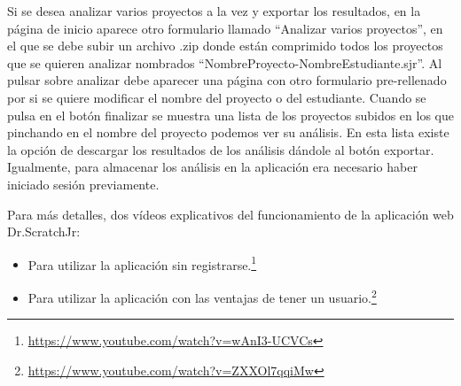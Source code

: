 \documentclass[a4paper, 12pt]{book}
\begin{document}
Si se desea analizar varios proyectos a la vez y exportar los resultados, en la página de inicio aparece otro formulario llamado ``Analizar varios proyectos'', en el que se debe subir un archivo .zip donde están comprimido todos los proyectos que se quieren analizar nombrados ``NombreProyecto-NombreEstudiante.sjr''.
Al pulsar sobre analizar debe aparecer una página con otro formulario pre-rellenado por si se quiere modificar el nombre del proyecto o del estudiante.
Cuando se pulsa en el botón finalizar se muestra una lista de los proyectos subidos en los que pinchando en el nombre del proyecto podemos ver su análisis.
En esta lista existe la opción de descargar los resultados de los análisis dándole al botón exportar.
Igualmente, para almacenar los análisis en la aplicación era necesario haber iniciado sesión previamente. 

Para más detalles, dos vídeos explicativos del funcionamiento de la aplicación web Dr.ScratchJr:
\begin{itemize}
    \item Para utilizar la aplicación sin registrarse.\footnote{\url{https://www.youtube.com/watch?v=wAnI3-UCVCs}}
    \item Para utilizar la aplicación con las ventajas de tener un usuario.\footnote{\url{https://www.youtube.com/watch?v=ZXXOl7qqiMw}}
\end{itemize}


\cleardoublepage


\end{document}
